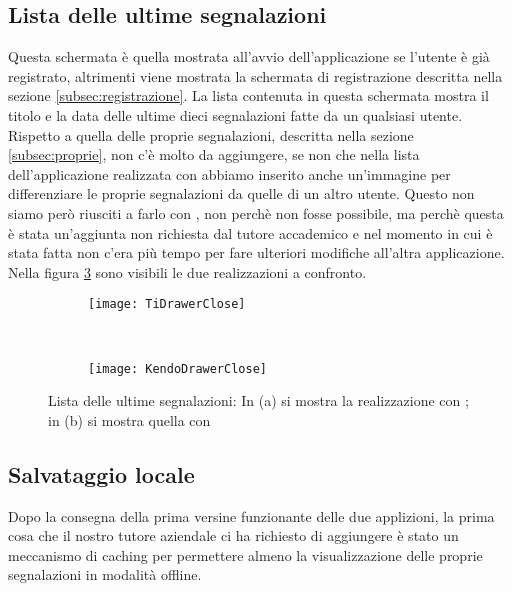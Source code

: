         \subsection{Lista delle ultime segnalazioni}
        Questa schermata è quella mostrata all'avvio dell'applicazione se
        l'utente è già registrato, altrimenti viene mostrata la schermata di
        registrazione descritta nella sezione \ref{subsec:registrazione}.
        La lista contenuta in questa schermata mostra il titolo e la data delle
        ultime dieci segnalazioni
        fatte da un qualsiasi utente. Rispetto a quella delle proprie
        segnalazioni, descritta nella sezione \ref{subsec:proprie}, non c'è
        molto da aggiungere, se non che nella lista dell'applicazione
        realizzata con \tisdk{} abbiamo inserito anche un'immagine per
        differenziare le proprie segnalazioni da quelle di un altro utente.
        Questo non siamo però riusciti a farlo con \kendomob{}, non perchè 
        non fosse possibile, ma perchè questa è stata un'aggiunta non richiesta 
        dal tutore accademico e nel momento in cui è stata fatta non c'era 
        più tempo per fare ulteriori modifiche all'altra applicazione. 
        Nella figura
        \ref{fig:last} sono visibili le due realizzazioni a confronto.
        
        \begin{figure}[h]
			\centering
			\begin{subfigure}[b]{0.485\textwidth}
				\texttt{[image: TiDrawerClose]}
				\caption{}
				\label{fig:tiLast}
			\end{subfigure}
			~
			\begin{subfigure}[b]{0.485\textwidth}
				\texttt{[image: KendoDrawerClose]}
				\caption{}
				\label{fig:kendoLast}
			\end{subfigure}
			\caption{Lista delle ultime segnalazioni: 
			In (a) si mostra la realizzazione con \tisdk{}; in (b) si mostra
			quella con \kendomob{}
			}
			\label{fig:last}
		\end{figure}

        
        \subsection{Salvataggio locale}
        \label{subsec:caching}
            Dopo la consegna della prima versine funzionante delle due
            applizioni, la prima cosa che il nostro tutore aziendale ci ha
            richiesto di aggiungere è stato un meccanismo di caching per
            permettere almeno la visualizzazione delle proprie segnalazioni in
            modalità offline.

